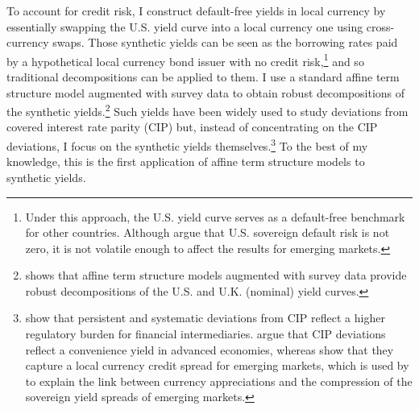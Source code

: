 {To account for credit risk, I construct default-free yields in local currency by essentially swapping the U.S. yield curve into a local currency one using cross-currency swaps. Those synthetic yields can be seen as the borrowing rates paid by a hypothetical local currency bond issuer with no credit risk,\footnote{ Under this approach, the U.S. yield curve serves as a default-free benchmark for other countries. Although \cite{ACCS:2019} argue that U.S. sovereign default risk is not zero, it is not volatile enough to affect the results for emerging markets.} and so traditional decompositions can be applied to them. I use a standard affine term structure model augmented with survey data to obtain robust decompositions of the synthetic yields.\footnote{ \cite{Guimaraes:2014} shows that affine term structure models augmented with survey data provide robust decompositions of the U.S. and U.K. (nominal) yield curves.} Such yields have been widely used to study deviations from covered interest rate parity (CIP) but, instead of concentrating on the CIP deviations, I focus on the synthetic yields themselves.\footnote{ \cite{DuTepperVerdelhan:2018} show that persistent and systematic deviations from CIP reflect a higher regulatory burden for financial intermediaries. \cite{DuImSchreger:2018JIE} argue that CIP deviations reflect a convenience yield in advanced economies, whereas \cite{DuSchreger:2016JoF} show that they capture a local currency credit spread for emerging markets, which is used by \cite{HofmannShimShin:2019} to explain the link between currency appreciations and the compression of the sovereign yield spreads of emerging markets.} To the best of my knowledge, this is the first application of affine term structure models to synthetic yields. 

}
